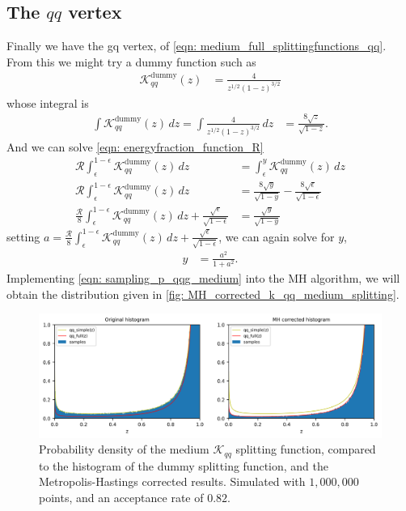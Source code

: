 \documentclass[main.tex]{subfiles}
\begin{document}
\subsection*{The \(qq\) vertex}
Finally we have the gq vertex, of \autoref{eqn: medium_full_splittingfunctions_qq}. From this we might try a dummy function such as
\begin{align}
    \mathcal{K}_{qq}^{\text{dummy}}(z) &= \frac{4}{z^{1/2} (1-z)^{3/2}}
\end{align}
whose integral is
\begin{align}
    \int \mathcal{K}_{qq}^{\text{dummy}}(z)\,dz = \int \frac{4}{z^{1/2}(1-z)^{3/2}} \,dz &= \frac{8 \sqrt{z}}{\sqrt{1-z}}.
\end{align}
And we can solve \autoref{eqn: energyfraction_function_R}
\begin{align}
    \mathcal{R}\int_\epsilon^{1-\epsilon} \mathcal{K}_{qq}^{\text{dummy}}(z)\,dz  &= \int_\epsilon^{y} \mathcal{K}_{qq}^{\text{dummy}}(z)\,dz  \nonumber\\
    \mathcal{R}\int_\epsilon^{1-\epsilon} \mathcal{K}_{qq}^{\text{dummy}}(z)\,dz  &= \frac{8\sqrt{y}}{\sqrt{1-y}} - \frac{8\sqrt{\epsilon}}{\sqrt{1-\epsilon}} \nonumber\\
    \frac{\mathcal{R}}{8} \int_\epsilon^{1-\epsilon} \mathcal{K}_{qq}^{\text{dummy}}(z)\,dz + \frac{\sqrt{\epsilon}}{\sqrt{1-\epsilon}} &= \frac{\sqrt{y}}{\sqrt{1-y}}
\end{align}
setting \(a = \frac{\mathcal{R}}{8} \int_\epsilon^{1-\epsilon} \mathcal{K}_{qq}^{\text{dummy}}(z)\,dz + \frac{\sqrt{\epsilon}}{\sqrt{1-\epsilon}}\), we can again solve for \(y\),
\begin{align} \label{eqn: sampling_p_qqg_medium}
    y &= \frac{a^2}{1 + a^2}.
\end{align}
Implementing \autoref{eqn: sampling_p_qqg_medium} into the MH algorithm, we will obtain the distribution given in \autoref{fig: MH_corrected_k_qq_medium_splitting}.
\begin{figure}[hb]
    \centering
    \includegraphics[width=15cm]{pictures/plots/Metropolis-Hastings/MH_medium_qq.png}
    \caption{Probability density of the medium \(\mathcal{K}_{qq}\) splitting function, compared to the histogram of the dummy splitting function, and the Metropolis-Hastings corrected results. Simulated with \(1,000,000\) points, and an acceptance rate of \(0.82\).}
    \label{fig: MH_corrected_k_qq_medium_splitting}
\end{figure}
\end{document}
